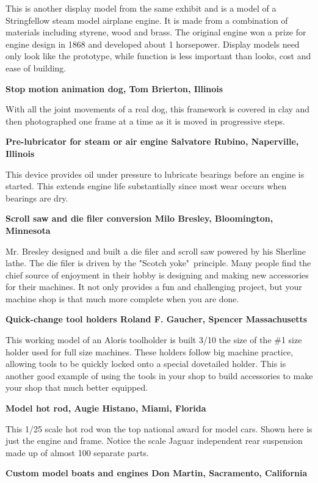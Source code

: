 This is another display model from the same exhibit and is a model of a
Stringfellow steam model airplane engine. It is made from a combination of
materials including styrene, wood and brass. The original engine won a prize for
engine design in 1868 and developed about 1 horsepower. Display models need only
look like the prototype, while function is less important than looks, cost and
ease of building.

\bigskip
\textbf{Stop motion animation dog, Tom Brierton, Illinois}

With all the joint movements of a real dog, this framework is covered in clay
and then photographed one frame at a time as it is moved in progressive steps.

\bigskip
\textbf{Pre-lubricator for steam or air engine Salvatore Rubino, Naperville,
Illinois}

This device provides oil under pressure to lubricate bearings before an engine
is started. This extends engine life substantially since most wear occurs when
bearings are dry.

\bigskip
\textbf{Scroll saw and die filer conversion Milo Bresley, Bloomington,
Minnesota}

Mr. Bresley designed and built a die filer and scroll saw powered by his
Sherline lathe. The die filer is driven by the "Scotch yoke"\ principle. Many
people find the chief source of enjoyment in their hobby is designing and making
new accessories for their machines. It not only provides a fun and challenging
project, but your machine shop is that much more complete when you are done.

\bigskip
\textbf{Quick-change tool holders Roland F. Gaucher, Spencer Massachusetts}

This working model of an Aloris toolholder is built 3/10 the size of the \#1
size holder used for full size machines. These holders follow big machine
practice, allowing tools to be quickly locked onto a special dovetailed holder.
This is another good example of using the tools in your shop to build
accessories to make your shop that much better equipped.

\bigskip
\textbf{Model hot rod, Augie Histano, Miami, Florida}

This 1/25 scale hot rod won the top national award for model cars. Shown here is
just the engine and frame. Notice the scale Jaguar independent rear suspension
made up of almost 100 separate parts.

\bigskip
\textbf{Custom model boats and engines Don Martin, Sacramento, California}

